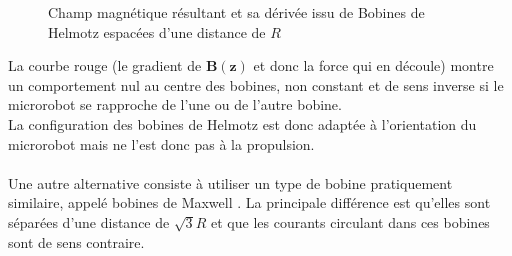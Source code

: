 \documentclass{article}
\begin{document}
    \begin{figure}[H]
        \centering
        \caption{Champ magnétique résultant et sa dérivée issu de Bobines de Helmotz espacées d'une distance de \(R\)}
    \end{figure}
\noindent
La courbe rouge (le gradient de $\mathbf{B(z)}$ et donc la force qui en découle) montre un comportement nul au centre des bobines, non constant et de sens inverse si le microrobot se rapproche de l'une ou de l'autre bobine.\\
\noindent
La configuration des bobines de Helmotz est donc adaptée à l'orientation du microrobot mais ne l'est donc pas à la propulsion.
        \\\\
        Une autre alternative consiste à utiliser un type de bobine pratiquement similaire, appelé bobines de Maxwell \cite{ref6}. La principale différence est qu'elles sont séparées d'une distance de \(\sqrt{3}R\) et que les courants circulant dans ces bobines sont de sens contraire.
\end{document}
